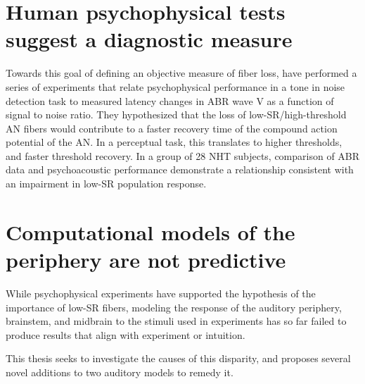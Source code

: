 \section{Human psychophysical tests suggest a diagnostic measure}

Towards this goal of defining an objective measure of fiber loss, \cite{Mehraei2015Individual,Mehraei2016Auditory} have performed a series of experiments that relate psychophysical performance in a tone in noise detection task to measured latency changes in ABR wave V as a function of signal to noise ratio.  They hypothesized that the loss of low-SR/high-threshold AN fibers would contribute to a faster recovery time of the compound action potential of the AN.  In a perceptual task, this translates to higher thresholds, and faster threshold recovery. In a group of 28 NHT subjects, comparison of ABR data and psychoacoustic performance demonstrate a relationship consistent with an impairment in low-SR population response.

\section{Computational models of the periphery are not predictive}

While psychophysical experiments have supported the hypothesis of the importance of low-SR fibers, modeling the response of the auditory periphery, brainstem, and midbrain to the stimuli used in experiments has so far failed to produce results that align with experiment or intuition.

This thesis seeks to investigate the causes of this disparity, and proposes several novel additions to two auditory models to remedy it. 


